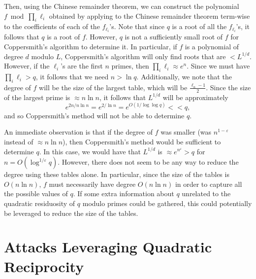 \documentclass[letterpaper,twocolumn,10pt]{article}
\begin{document}
Then, using the Chinese remainder theorem, we can construct the polynomial $f \bmod \prod_i \ell_i$ obtained by applying to the Chinese remainder theorem term-wise to the coefficients of each of the $f_{\ell_i}$'s. Note that since $q$ is a root of all the $f_{\ell_i}$'s, it follows that $q$ is a root of $f$. However, $q$ is not a sufficiently small root of $f$ for Coppersmith's algorithm to determine it. In particular, if $f$ is a polynomial of degree $d$ modulo $L$, Coppersmith's algorithm will only find roots that are $< L^{1/d}$. However, if the $\ell_i$'s are the first $n$ primes, then $\prod_i \ell_i \approx e^n$. Since we must have $\prod_i \ell_i > q$, it follows that we need $n > \ln q$. Additionally, we note that the degree of $f$ will be the size of the largest table, which will be $\frac{\ell_n - 1}{2}$. Since the size of the largest prime is $\approx n \ln n$, it follows that $L^{1/d}$ will be approximately
\[
e^{2n/n\ln n} = e^{2/\ln n} = e^{O(1/\log \log q)}  << q,
\]  
and so Coppersmith's method will not be able to determine $q$.

An immediate observation is that if the degree of $f$ was smaller (was $n^{1 - \varepsilon}$ instead of $\approx n \ln n$), then Coppersmith's method would be sufficient to determine $q$. In this case, we would have that $L^{1/d}$ is $\approx e^{n^{\varepsilon}} > q$ for $n = O(\log^{1/\varepsilon} q)$. However, there does not seem to be any way to reduce the degree using these tables alone. In particular, since the size of the tables is $O(n \ln n)$, $f$ must necessarily have degree $O(n \ln n)$ in order to capture all the possible values of $q$. If some extra information about $q$ unrelated to the quadratic residuosity of $q$ modulo primes could be gathered, this could potentially be leveraged to reduce the size of the tables. 






\section{Attacks Leveraging Quadratic Reciprocity } 
\label{alg}
\end{document}
